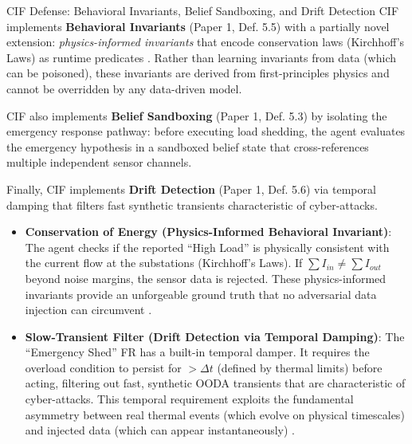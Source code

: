 \documentclass[
  ignorenonframetext,
]{beamer}
\providecommand{\tightlist}{%
  \setlength{\itemsep}{0pt}\setlength{\parskip}{0pt}}
\begin{document}
\begin{frame}[allowframebreaks]{CIF Defense: Behavioral Invariants,
Belief Sandboxing, and Drift Detection}
\protect{}\label{cif-defense-behavioral-invariants-belief-sandboxing-and-drift-detection}
CIF implements \textbf{Behavioral Invariants} (Paper 1, Def. 5.5)
\cite{friedman2026cogsec1} with a partially novel extension:
\emph{physics-informed invariants} that encode conservation laws
(Kirchhoff's Laws) as runtime predicates \cite{raissi2019physics}.
Rather than learning invariants from data (which can be poisoned), these
invariants are derived from first-principles physics and cannot be
overridden by any data-driven model.

CIF also implements \textbf{Belief Sandboxing} (Paper 1, Def. 5.3)
\cite{friedman2026cogsec1} by isolating the emergency response pathway:
before executing load shedding, the agent evaluates the emergency
hypothesis in a sandboxed belief state that cross-references multiple
independent sensor channels.

Finally, CIF implements \textbf{Drift Detection} (Paper 1, Def. 5.6)
\cite{friedman2026cogsec1} via temporal damping that filters fast
synthetic transients characteristic of cyber-attacks.

\begin{itemize}
\tightlist
\item
  \textbf{Conservation of Energy (Physics-Informed Behavioral
  Invariant)}: The agent checks if the reported ``High Load'' is
  physically consistent with the current flow at the substations
  (Kirchhoff's Laws). If \(\sum I_{in} \neq \sum I_{out}\) beyond noise
  margins, the sensor data is rejected. These physics-informed
  invariants provide an unforgeable ground truth that no adversarial
  data injection can circumvent
  \cite{raissi2019physics, friedman2026cogsec3}.
\item
  \textbf{Slow-Transient Filter (Drift Detection via Temporal Damping)}:
  The ``Emergency Shed'' FR has a built-in temporal damper. It requires
  the overload condition to persist for \(> \Delta t\) (defined by
  thermal limits) before acting, filtering out fast, synthetic OODA
  transients that are characteristic of cyber-attacks. This temporal
  requirement exploits the fundamental asymmetry between real thermal
  events (which evolve on physical timescales) and injected data (which
  can appear instantaneously) \cite{liang2017review}.
\end{itemize}
\end{frame}
\end{document}
